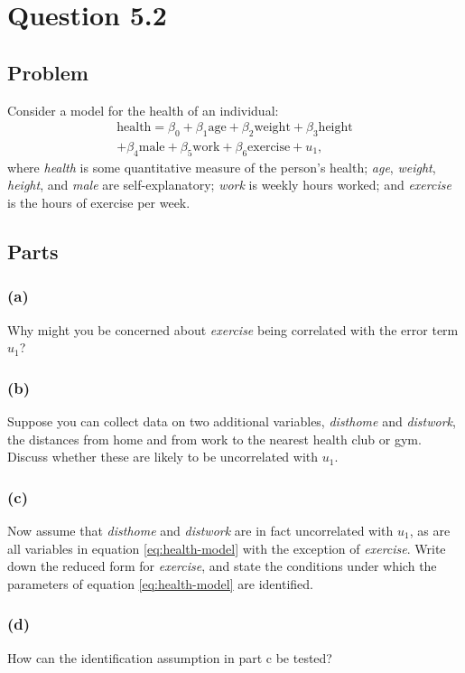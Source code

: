 \documentclass[10pt, a4paper]{article}
\begin{document}
\section*{Question 5.2}
  \subsection*{Problem}
    Consider a model for the health of an individual:
    \begin{gather}
      \text{health} = \beta_0 + \beta_1\text{age} + \beta_2\text{weight} + \beta_3\text{height} \nonumber \\
      + \beta_4\text{male} + \beta_5\text{work} + \beta_6\text{exercise} + u_1, \label{eq:health-model}
    \end{gather}
    where \textit{health} is some quantitative measure of the person's health; \textit{age}, \textit{weight}, \textit{height}, and \textit{male} are self-explanatory; \textit{work} is weekly hours worked; and \textit{exercise} is the hours of exercise per week.
  \subsection*{Parts}
    \subsubsection*{(a)}
      Why might you be concerned about \textit{exercise} being correlated with the error term $u_1$?
    \subsubsection*{(b)}
      Suppose you can collect data on two additional variables, \textit{disthome} and \textit{distwork}, the distances from home and from work to the nearest health club or gym. Discuss whether these are likely to be uncorrelated with $u_1$.
    \subsubsection*{(c)}
      Now assume that \textit{disthome} and \textit{distwork} are in fact uncorrelated with $u_1$, as are all variables in equation \eqref{eq:health-model} with the exception of \textit{exercise}. Write down the reduced form for \textit{exercise}, and state the conditions under which the parameters of equation \eqref{eq:health-model} are identified.
    \subsubsection*{(d)}
      How can the identification assumption in part c be tested?
\end{document}
